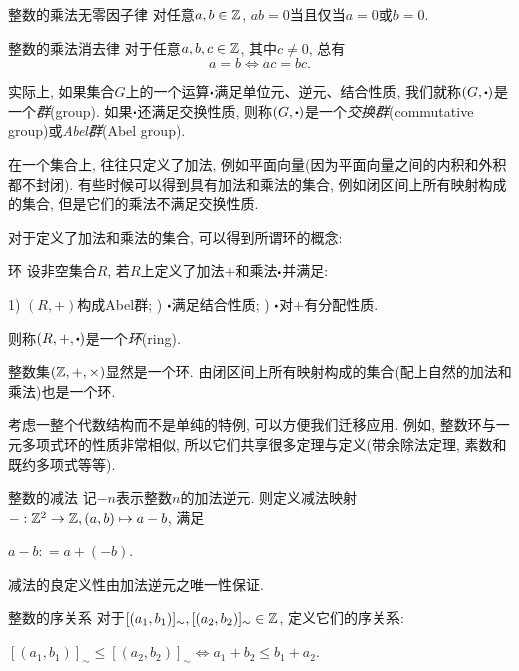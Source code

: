 \begin{proposition}{整数的乘法无零因子律}
	对任意$a, b \in \mathbb{Z}$, $ab=0$当且仅当$a=0$或$b=0$.
\end{proposition}

\begin{corollary}{整数的乘法消去律}
	对于任意$a, b, c \in \mathbb{Z}$, 其中$c \neq 0$, 总有$$a=b \Leftrightarrow ac=bc.$$
\end{corollary}

实际上, 如果集合$G$上的一个运算$\bigcdot$满足单位元、逆元、结合性质, 我们就称$(G,\bigcdot )$是一个\textit{群}(group). 如果$\bigcdot$还满足交换性质, 则称$(G,\bigcdot )$是一个\textit{交换群}(commutative group)或\textit{Abel群}(Abel group).

在一个集合上, 往往只定义了加法, 例如平面向量(因为平面向量之间的内积和外积都不封闭). 有些时候可以得到具有加法和乘法的集合, 例如闭区间上所有映射构成的集合, 但是它们的乘法不满足交换性质. 

对于定义了加法和乘法的集合, 可以得到所谓环的概念: 

\begin{axiom}{环}
	设非空集合$R$, 若$R$上定义了加法$+$和乘法$\bigcdot$并满足: 
	
	1) $(R,+)$构成Abel群; ) $\bigcdot$满足结合性质; ) $\bigcdot$对$+$有分配性质. 
	
	\noindent
	则称$(R,+,\bigcdot )$是一个\textit{环}(ring).
\end{axiom}

整数集$(\mathbb{Z} ,+,\times )$显然是一个环. 由闭区间上所有映射构成的集合(配上自然的加法和乘法)也是一个环. 

考虑一整个代数结构而不是单纯的特例, 可以方便我们迁移应用. 例如, 整数环与一元多项式环的性质非常相似, 所以它们共享很多定理与定义(带余除法定理, 素数和既约多项式等等). 

\begin{definition}{整数的减法}
	记$-n$表示整数$n$的加法逆元. 则定义减法映射$-: \mathbb{Z} ^2 \to \mathbb{Z} , (a, b) \mapsto a-b$, 满足
	\begin{center}
		$a-b: =a+(-b)$.
	\end{center}
\end{definition}

减法的良定义性由加法逆元之唯一性保证. 

\begin{definition}{整数的序关系}
	对于$[(a_1, b_1)]_{\sim}, [(a_2, b_2)]_{\sim} \in \mathbb{Z}$, 定义它们的序关系: 
	\begin{center}
		$[(a_1, b_1)]_{\sim} \leq [(a_2, b_2)]_{\sim} \Leftrightarrow a_1+b_2 \leq b_1+a_2$. 
	\end{center}
\end{definition}

